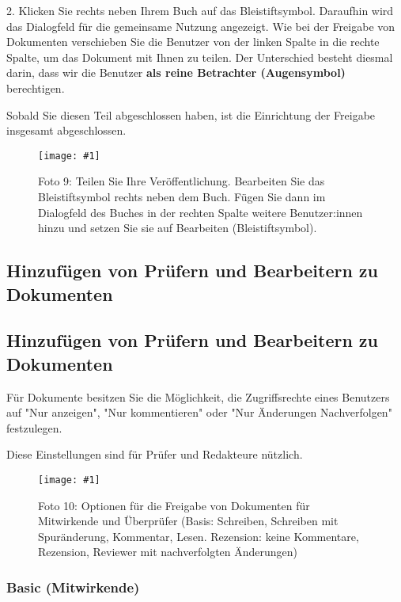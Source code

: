 \documentclass{article}
\newlength{\imgwidth}
\newcommand\scaledgraphics[2]{%
                
\settowidth{\imgwidth}{\texttt{[image: \#1]}}%
                
\setlength{\imgwidth}{\minof{\imgwidth}{#2\textwidth}}%
                
\texttt{[image: \#1]}%
                
}
\begin{document}
2. Klicken Sie rechts neben Ihrem Buch auf das Bleistiftsymbol. Daraufhin wird das Dialogfeld für die gemeinsame Nutzung angezeigt. Wie bei der Freigabe von Dokumenten verschieben Sie die Benutzer von der linken Spalte in die rechte Spalte, um das Dokument mit Ihnen zu teilen. Der Unterschied besteht diesmal darin, dass wir die Benutzer \textbf{als reine Betrachter (Augensymbol)} berechtigen.


Sobald Sie diesen Teil abgeschlossen haben, ist die Einrichtung der Freigabe insgesamt abgeschlossen.

\begin{figure}
\scaledgraphics{307a65dd-0aa1-43ba-97aa-0811ec5d396a.png}{1}
\caption*{Foto 9: Teilen Sie Ihre Veröffentlichung. Bearbeiten Sie das Bleistiftsymbol rechts neben dem Buch. Fügen Sie dann im Dialogfeld des Buches in der rechten Spalte weitere Benutzer:innen hinzu und setzen Sie sie auf Bearbeiten (Bleistiftsymbol).}\label{F50686771}
\end{figure}


\subsection{Hinzufügen von Prüfern und Bearbeitern zu Dokumenten}\label{H5555602}



\subsection{Hinzufügen von Prüfern und Bearbeitern zu Dokumenten}\label{H4871756}



Für Dokumente besitzen Sie die Möglichkeit, die Zugriffsrechte eines Benutzers auf "Nur anzeigen", "Nur kommentieren" oder "Nur Änderungen Nachverfolgen" festzulegen.


Diese Einstellungen sind für Prüfer und Redakteure nützlich.

\begin{figure}
\scaledgraphics{ab818b4d-2c97-46c1-94eb-b3c6f50a112a.png}{1}
\caption*{Foto 10: Optionen für die Freigabe von Dokumenten für Mitwirkende und Überprüfer (Basis: Schreiben, Schreiben mit Spuränderung, Kommentar, Lesen. Rezension: keine Kommentare, Rezension, Reviewer mit nachverfolgten Änderungen)}\label{F40650491}
\end{figure}


\subsubsection{Basic (Mitwirkende)}\label{H2272325}
\end{document}
